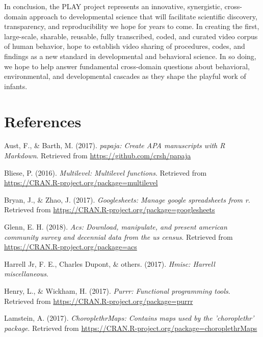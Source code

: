 \documentclass[english,man]{apa6}
\theoremstyle{definition}
\theoremstyle{definition}
\theoremstyle{definition}
\theoremstyle{remark}
\begin{document}
In conclusion, the PLAY project represents an innovative, synergistic,
cross-domain approach to developmental science that will facilitate
scientific discovery, transparency, and reproducibility we hope for
years to come. In creating the first, large-scale, sharable, reusable,
fully transcribed, coded, and curated video corpus of human behavior,
hope to establish video sharing of procedures, codes, and findings as a
new standard in developmental and behavioral science. In so doing, we
hope to help answer fundamental cross-domain questions about behavioral,
environmental, and developmental cascades as they shape the playful work
of infants.

\newpage

\section{References}\label{references}

\setlength{\parindent}{-0.5in} \setlength{\leftskip}{0.5in}

\hypertarget{refs}{}
\hypertarget{ref-R-papaja}{}
Aust, F., \& Barth, M. (2017). \emph{papaja: Create APA manuscripts with
R Markdown}. Retrieved from \url{https://github.com/crsh/papaja}

\hypertarget{ref-R-multilevel}{}
Bliese, P. (2016). \emph{Multilevel: Multilevel functions}. Retrieved
from \url{https://CRAN.R-project.org/package=multilevel}

\hypertarget{ref-R-googlesheets}{}
Bryan, J., \& Zhao, J. (2017). \emph{Googlesheets: Manage google
spreadsheets from r}. Retrieved from
\url{https://CRAN.R-project.org/package=googlesheets}

\hypertarget{ref-R-acs}{}
Glenn, E. H. (2018). \emph{Acs: Download, manipulate, and present
american community survey and decennial data from the us census}.
Retrieved from \url{https://CRAN.R-project.org/package=acs}

\hypertarget{ref-R-Hmisc}{}
Harrell Jr, F. E., Charles Dupont, \& others. (2017). \emph{Hmisc:
Harrell miscellaneous}.

\hypertarget{ref-R-purrr}{}
Henry, L., \& Wickham, H. (2017). \emph{Purrr: Functional programming
tools}. Retrieved from \url{https://CRAN.R-project.org/package=purrr}

\hypertarget{ref-R-choroplethrMaps}{}
Lamstein, A. (2017). \emph{ChoroplethrMaps: Contains maps used by the
'choroplethr' package}. Retrieved from
\url{https://CRAN.R-project.org/package=choroplethrMaps}
\end{document}
